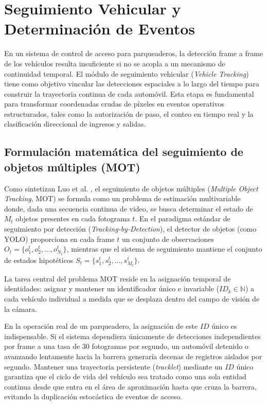 \section{Seguimiento Vehicular y Determinación de Eventos}

En un sistema de control de acceso para parqueaderos, la detección frame a frame
de los vehículos resulta insuficiente si no se acopla a un mecanismo de
continuidad temporal. El módulo de seguimiento vehicular (\textit{Vehicle
Tracking}) tiene como objetivo vincular las detecciones espaciales a lo largo
del tiempo para construir la trayectoria continua de cada automóvil. Esta etapa
es fundamental para transformar coordenadas crudas de píxeles en eventos
operativos estructurados, tales como la autorización de paso, el conteo en
tiempo real y la clasificación direccional de ingresos y salidas.

\subsection{Formulación matemática del seguimiento de objetos múltiples (MOT)}

Como sintetizan Luo et al. \cite{luo2021mot}, el seguimiento de objetos
múltiples (\textit{Multiple Object Tracking}, MOT) se formula como un problema
de estimación multivariable donde, dada una secuencia continua de video, se
busca determinar el estado de $M_t$ objetos presentes en cada fotograma $t$. En
el paradigma estándar de seguimiento por detección (\textit{Tracking-by-Detection}), 
el detector de objetos (como YOLO) proporciona en cada frame $t$ un conjunto de
observaciones $O_t = \{o_1^t, o_2^t, \dots, o_{N_t}^t\}$, mientras que el sistema
de seguimiento mantiene el conjunto de estados hipotéticos $S_t = \{s_1^t, s_2^t, \dots, s_{M_t}^t\}$.

La tarea central del problema MOT reside en la asignación temporal de identidades:
asignar y mantener un identificador único e invariable ($ID_k \in \mathbb{N}$) a
cada vehículo individual a medida que se desplaza dentro del campo de visión de
la cámara. 

En la operación real de un parqueadero, la asignación de este $ID$ único es
indispensable. Si el sistema dependiera únicamente de detecciones independientes
por frame a una tasa de 30 fotogramas por segundo, un automóvil detenido o
avanzando lentamente hacia la barrera generaría decenas de registros aislados
por segundo. Mantener una trayectoria persistente (\textit{tracklet}) mediante
un $ID$ único garantiza que el ciclo de vida del vehículo sea tratado como una
sola entidad continua desde que entra en el área de aproximación hasta que cruza
la barrera, evitando la duplicación estocástica de eventos de acceso.

